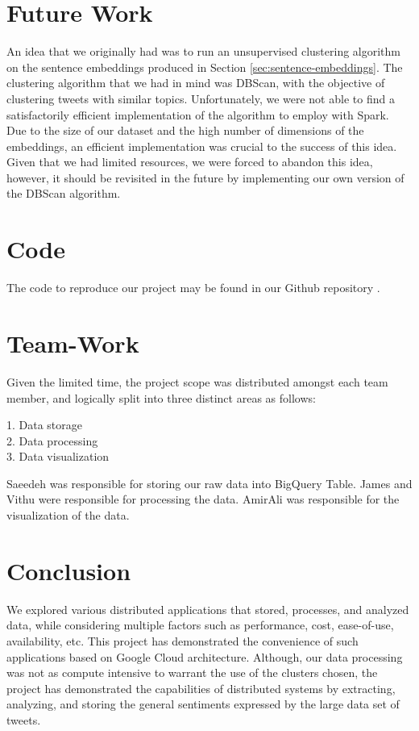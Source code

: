 \documentclass[a4paper,12pt]{article}
\begin{document}
\section{Future Work}
An idea that we originally had was to run an unsupervised clustering algorithm on the sentence embeddings produced in Section \ref{sec:sentence-embeddings}. The clustering algorithm that we had in mind was DBScan\cite{Ester96adensity-based}, with the objective of clustering tweets with similar topics. Unfortunately, we were not able to find a satisfactorily efficient implementation of the algorithm to employ with Spark. Due to the size of our dataset and the high number of dimensions of the embeddings, an efficient implementation was crucial to the success of this idea. Given that we had limited resources, we were forced to abandon this idea, however, it should be revisited in the future by implementing our own version of the DBScan algorithm.

\section{Code}
The code to reproduce our project may be found in our Github repository \cite{Githubrepository}.

\section{Team-Work}
Given the limited time, the project scope was distributed amongst each team member, and logically split into three distinct
areas as follows:

1. Data storage\\
2. Data processing\\
3. Data visualization

Saeedeh was responsible for storing our raw data into BigQuery Table.
James and Vithu were responsible for processing the data.
AmirAli was responsible for the visualization of the data.

\section{Conclusion}
We explored various distributed applications that stored, processes, and analyzed data, while considering multiple
factors such as performance, cost, ease-of-use, availability, etc. This project has demonstrated the convenience
of such applications based on Google Cloud architecture. Although, our data processing was not as compute intensive
to warrant the use of the clusters chosen, the project has demonstrated the capabilities of distributed systems by
extracting, analyzing, and storing the general sentiments expressed by the large data set of tweets.

\nocite{*}



\end{document}
